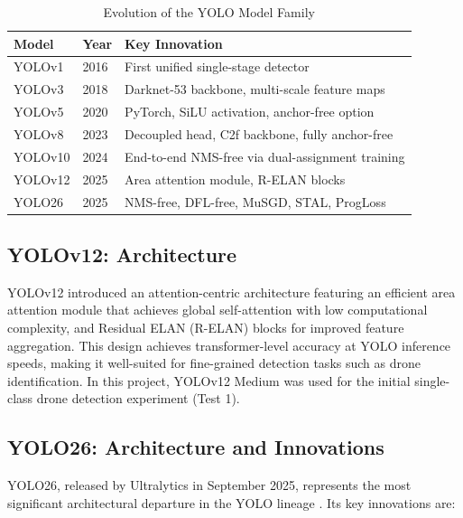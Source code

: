 \documentclass[12pt,a4paper]{report}
\begin{document}
\begin{table}[H]
\centering
\caption{Evolution of the YOLO Model Family}
\label{tab:yolo_evolution}
\begin{tabular}{@{}llp{8cm}@{}}
\toprule
\textbf{Model} & \textbf{Year} & \textbf{Key Innovation} \\
\midrule
YOLOv1 & 2016 & First unified single-stage detector \\
YOLOv3 & 2018 & Darknet-53 backbone, multi-scale feature maps \\
YOLOv5 & 2020 & PyTorch, SiLU activation, anchor-free option \\
YOLOv8 & 2023 & Decoupled head, C2f backbone, fully anchor-free \\
YOLOv10 & 2024 & End-to-end NMS-free via dual-assignment training \\
YOLOv12 & 2025 & Area attention module, R-ELAN blocks \\
YOLO26 & 2025 & NMS-free, DFL-free, MuSGD, STAL, ProgLoss \\
\bottomrule
\end{tabular}
\end{table}

\subsection{YOLOv12: Architecture}

YOLOv12 introduced an attention-centric architecture featuring an efficient area
attention module that achieves global self-attention with low computational
complexity, and Residual ELAN (R-ELAN) blocks for improved feature aggregation.
This design achieves transformer-level accuracy at YOLO inference speeds, making
it well-suited for fine-grained detection tasks such as drone identification.
In this project, YOLOv12 Medium was used for the initial single-class drone
detection experiment (Test 1).

\subsection{YOLO26: Architecture and Innovations}

YOLO26, released by Ultralytics in September 2025, represents the most significant
architectural departure in the YOLO lineage \cite{sapkota2025yolo26}. Its key
innovations are:
\end{document}
